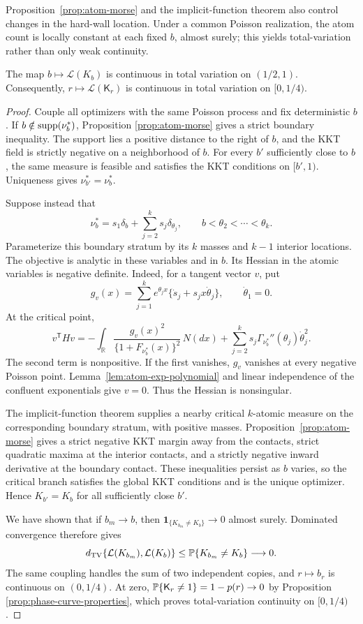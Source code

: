 Proposition~\ref{prop:atom-morse} and the implicit-function theorem also
control changes in the hard-wall location. Under a common Poisson
realization, the atom count is locally constant at each fixed \(b\), almost
surely; this yields total-variation rather than only weak continuity.
\begin{proposition}
\label{prop:atom-count-continuity}
The map \(b\mapsto\mathcal L(K_b)\) is continuous in total variation on
\((1/2,1)\). Consequently,
\(r\mapsto\mathcal L(\mathsf K_r)\) is continuous in total variation on
\([0,1/4)\).
\end{proposition}

\begin{proof}
Couple all optimizers with the same Poisson process and fix deterministic
\(b\). If \(b\notin\operatorname{supp}(\nu_b^*)\), Proposition
\ref{prop:atom-morse} gives a strict boundary inequality. The support lies a
positive distance to the right of \(b\), and the KKT field is strictly
negative on a neighborhood of \(b\). For every \(b'\) sufficiently close to
\(b\), the same measure is feasible and satisfies the KKT conditions on
\([b',1)\). Uniqueness gives \(\nu_{b'}^*=\nu_b^*\).

Suppose instead that
\[
    \nu_b^*=s_1\delta_b+\sum_{j=2}^ks_j\delta_{\theta_j},
    \qquad b<\theta_2<\cdots<\theta_k.
\]
Parameterize this boundary stratum by its \(k\) masses and \(k-1\) interior
locations. The objective is analytic in these variables and in \(b\). Its
Hessian in the atomic variables is negative definite. Indeed, for a tangent
vector \(v\), put
\[
    g_v(x)=\sum_{j=1}^ke^{\theta_jx}
       \{\dot s_j+s_jx\dot\theta_j\},
    \qquad \dot\theta_1=0.
\]
At the critical point,
\[
 v^{\mathsf T}Hv
 =-\int_{\mathbb R}
       \frac{g_v(x)^2}{\{1+F_{\nu_b^*}(x)\}^2}\,N(dx)
   +\sum_{j=2}^ks_j
       \Gamma_{\nu_b^*}''(\theta_j)\dot\theta_j^2.
\]
The second term is nonpositive. If the first vanishes, \(g_v\) vanishes at
every negative Poisson point. Lemma~\ref{lem:atom-exp-polynomial} and linear
independence of the confluent exponentials give \(v=0\). Thus the Hessian is
nonsingular.

The implicit-function theorem supplies a nearby critical \(k\)-atomic
measure on the corresponding boundary stratum, with positive masses.
Proposition~\ref{prop:atom-morse} gives a strict negative KKT margin away
from the contacts, strict quadratic maxima at the interior contacts, and a
strictly negative inward derivative at the boundary contact. These
inequalities persist as \(b\) varies, so the critical branch satisfies the
global KKT conditions and is the unique optimizer. Hence \(K_{b'}=K_b\) for
all sufficiently close \(b'\).

We have shown that if \(b_m\to b\), then
\(\mathbf1_{\{K_{b_m}\ne K_b\}}\to0\) almost surely. Dominated convergence
therefore gives
\[
 d_{\mathrm{TV}}\{\mathcal L(K_{b_m}),\mathcal L(K_b)\}
 \le\mathbb{P}\{K_{b_m}\ne K_b\}\longrightarrow0.
\]
The same coupling handles the sum of two independent copies, and
\(r\mapsto b_r\) is continuous on \((0,1/4)\). At zero,
\(\mathbb{P}\{\mathsf K_r\ne1\}=1-p(r)\to0\) by Proposition
\ref{prop:phase-curve-properties}, which proves total-variation continuity on
\([0,1/4)\).
\end{proof}

